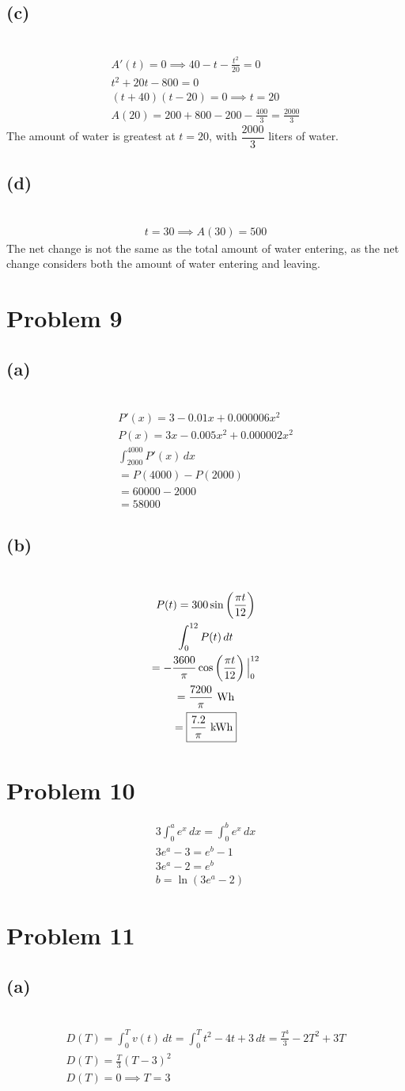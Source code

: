 \documentclass[12pt]{article}
\newcommand*{\paren}[1]{\ensuremath\left(#1\right)}
\newcommand{\vem}{\vspace{0.5em}}
\newcommand{\problem}[1]{\section{Problem #1}}
\newcommand{\subproblem}[1]{\subsection{(#1)} \,}
\begin{document}
\subproblem{c}
\begin{gather*}
    A'(t)=0 \implies 40-t-\frac{t^2}{20}=0\\
    t^2+20t-800=0\\
    (t+40)(t-20)=0 \implies t=20\\
    A(20)=200+800-200-\frac{400}{3}=\frac{2000}{3}
\end{gather*}
The amount of water is greatest at $t=20$, with $\dfrac{2000}{3}$ liters of water.\vem

\subproblem{d}
\begin{gather*}
    t=30 \implies A(30)=500
\end{gather*}
The net change is not the same as the total amount of water entering, as the net change considers both the amount of water entering and leaving.

\problem{9}

\subproblem{a}
\begin{gather*}
    P'(x)=3-0.01x+0.000006x^2\\
    P(x)=3x-0.005x^2+0.000002x^2\\
    \int_{2000}^{4000}P'(x)\, dx\\
    =P(4000)-P(2000)\\
    =60000-2000\\
    =\boxed{58000}
\end{gather*}

\subproblem{b}
\begin{gather*}
    P(t)=300\sin \paren{\frac{\pi t}{12}}\\
    \int_0^{12} P(t)\, dt\\
    =-\frac{3600}{\pi}\cos \paren{\frac{\pi t}{12}} \Big|^{12}_0\\
    =\frac{7200}{\pi}\text{ Wh}\\
    =\boxed{\frac{7.2}{\pi} \text{ kWh}}
\end{gather*}

\problem{10}
\begin{gather*}
    3\int_0^a e^x\, dx= \int_0^b e^x\, dx\\
    3e^a-3=e^b-1\\
    3e^a-2=e^b\\
    \boxed{b=\ln (3e^a-2)}
\end{gather*}

\problem{11}

\subproblem{a}
\begin{gather*}
    D(T)=\int_0^T v(t)\, dt=\int_0^T t^2-4t+3\, dt= \frac{T^3}{3}-2T^2+3T\\
    D(T)=\frac{T}{3}(T-3)^2\\
    D(T)=0 \implies \boxed{T=3}
\end{gather*}
\end{document}

